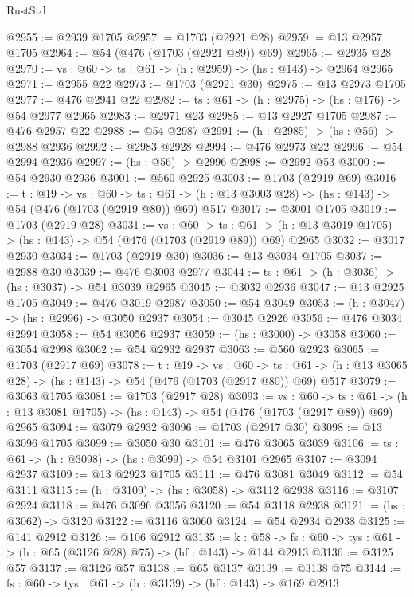 \begin{lexlean}{RustStd}
\begin{coremodule}
{\begin{coremodule}
{{{{{{{{{{{{{{{{{{{{{{{{{{{{{{{{{{{{{{@2955 := @2939 @1705
@2957 := @1703 (@2921 @28)
@2959 := @13 @2957 @1705
@2964 := @54 (@476 (@1703 (@2921 @89)) @69)
@2965 := @2935 @28
@2970 := {vs : @60} -> {ts : @61} -> (h : @2959) -> (hs : @143) -> @2964 @2965
@2971 := @2955 @22
@2973 := @1703 (@2921 @30)
@2975 := @13 @2973 @1705
@2977 := @476 @2941 @22
@2982 := {ts : @61} -> (h : @2975) -> (hs : @176) -> @54 @2977 @2965
@2983 := @2971 @23
@2985 := @13 @2927 @1705
@2987 := @476 @2957 @22
@2988 := @54 @2987
@2991 := (h : @2985) -> (hs : @56) -> @2988 @2936
@2992 := @2983 @2928
@2994 := @476 @2973 @22
@2996 := @54 @2994 @2936
@2997 := (hs : @56) -> @2996
@2998 := @2992 @53
@3000 := @54 @2930 @2936
@3001 := @560 @2925
@3003 := @1703 (@2919 @69)
@3016 := {t : @19} ->
  {vs : @60} ->
  {ts : @61} -> (h : @13 @3003 @28) -> (hs : @143) -> @54 (@476 (@1703 (@2919 @80)) @69) @517
@3017 := @3001 @1705
@3019 := @1703 (@2919 @28)
@3031 := {vs : @60} ->
  {ts : @61} -> (h : @13 @3019 @1705) -> (hs : @143) -> @54 (@476 (@1703 (@2919 @89)) @69) @2965
@3032 := @3017 @2930
@3034 := @1703 (@2919 @30)
@3036 := @13 @3034 @1705
@3037 := @2988 @30
@3039 := @476 @3003 @2977
@3044 := {ts : @61} -> (h : @3036) -> (hs : @3037) -> @54 @3039 @2965
@3045 := @3032 @2936
@3047 := @13 @2925 @1705
@3049 := @476 @3019 @2987
@3050 := @54 @3049
@3053 := (h : @3047) -> (hs : @2996) -> @3050 @2937
@3054 := @3045 @2926
@3056 := @476 @3034 @2994
@3058 := @54 @3056 @2937
@3059 := (hs : @3000) -> @3058
@3060 := @3054 @2998
@3062 := @54 @2932 @2937
@3063 := @560 @2923
@3065 := @1703 (@2917 @69)
@3078 := {t : @19} ->
  {vs : @60} ->
  {ts : @61} -> (h : @13 @3065 @28) -> (hs : @143) -> @54 (@476 (@1703 (@2917 @80)) @69) @517
@3079 := @3063 @1705
@3081 := @1703 (@2917 @28)
@3093 := {vs : @60} ->
  {ts : @61} -> (h : @13 @3081 @1705) -> (hs : @143) -> @54 (@476 (@1703 (@2917 @89)) @69) @2965
@3094 := @3079 @2932
@3096 := @1703 (@2917 @30)
@3098 := @13 @3096 @1705
@3099 := @3050 @30
@3101 := @476 @3065 @3039
@3106 := {ts : @61} -> (h : @3098) -> (hs : @3099) -> @54 @3101 @2965
@3107 := @3094 @2937
@3109 := @13 @2923 @1705
@3111 := @476 @3081 @3049
@3112 := @54 @3111
@3115 := (h : @3109) -> (hs : @3058) -> @3112 @2938
@3116 := @3107 @2924
@3118 := @476 @3096 @3056
@3120 := @54 @3118 @2938
@3121 := (hs : @3062) -> @3120
@3122 := @3116 @3060
@3124 := @54 @2934 @2938
@3125 := @141 @2912
@3126 := @106 @2912
@3135 := {k : @58} ->
  {fs : @60} -> {tys : @61} -> (h : @65 (@3126 @28) @75) -> (hf : @143) -> @144 @2913
@3136 := @3125 @57
@3137 := @3126 @57
@3138 := @65 @3137
@3139 := @3138 @75
@3144 := {fs : @60} -> {tys : @61} -> (h : @3139) -> (hf : @143) -> @169 @2913
}}}}}}}}}}}}}}}}}}}}}}}}}}}}}}}}}}}}}}
\end{coremodule}}
\end{coremodule}
\end{lexlean}
